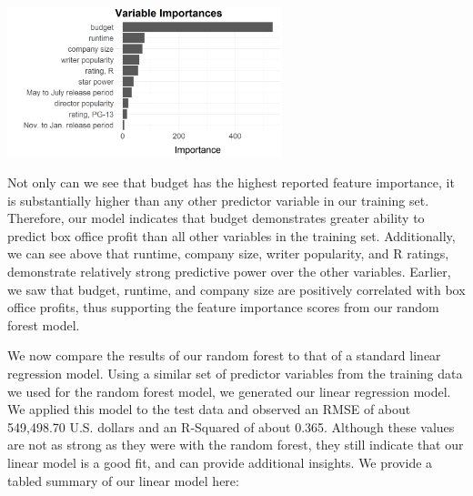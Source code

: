 \documentclass[10pt]{article}
\begin{document}
\begin{center}
\includegraphics[width=8cm]{_assets/predictive_analysis/variable_importance_rf_bop.png}
\end{center}

Not only can we see that budget has the highest reported feature importance, it is substantially higher than any other predictor variable in our training set. Therefore, our model indicates that budget demonstrates greater ability to predict box office profit than all other variables in the training set. Additionally, we can see above that runtime, company size, writer popularity, and R ratings, demonstrate relatively strong predictive power over the other variables. Earlier, we saw that budget, runtime, and company size are positively correlated with box office profits, thus supporting the feature importance scores from our random forest model. 

We now compare the results of our random forest to that of a standard linear regression model. Using a similar set of predictor variables from the training data we used for the random forest model, we generated our linear regression model. We applied this model to the test data and observed an RMSE of about 549,498.70 U.S. dollars and an R-Squared of about 0.365. Although these values are not as strong as they were with the random forest, they still indicate that our linear model is a good fit, and can provide additional insights. We provide a tabled summary of our linear model here:


\end{document}
